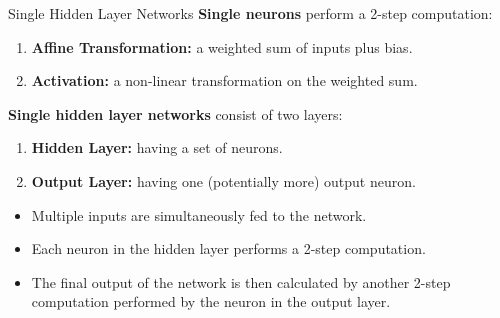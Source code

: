 \begin{vbframe}{Single Hidden Layer Networks}
\textbf{Single neurons} perform a 2-step computation:
\begin{enumerate}
\item \textbf{Affine Transformation:} a weighted sum of inputs plus bias.
\item \textbf{Activation:} a non-linear transformation on the weighted sum.
\end{enumerate}
\vspace{.5cm}
\textbf{Single hidden layer networks} consist of two layers:
\begin{enumerate}
\item \textbf{Hidden Layer:} having a set of neurons.
\item \textbf{Output Layer:} having one (potentially more) output neuron.
\end{enumerate}
\vspace{.5cm}
\begin{itemize}
\item Multiple inputs are simultaneously fed to the network.
\vspace{.2cm}
\item Each neuron in the hidden layer performs a 2-step computation.
\vspace{.2cm}
\item The final output of the network is then calculated by another 2-step computation performed by the neuron in the output layer.
\end{itemize}
\end{vbframe}

